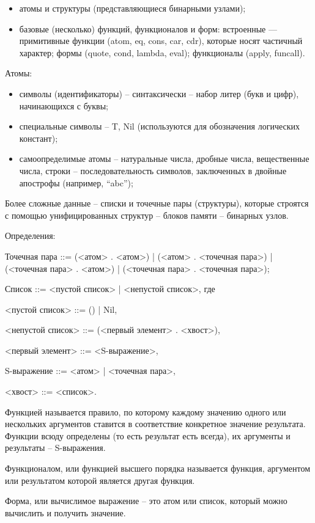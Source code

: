 \documentclass[12pt]{report}
\begin{document}
\begin{itemize}
	\item атомы и структуры (представляющиеся бинарными узлами);
	\item базовые (несколько) функций, функционалов и форм: встроенные — примитивные функции (atom, eq, cons, car, cdr), которые носят частичный  характер; формы (quote, cond, lambda, eval); функционалы (apply, funcall).
\end{itemize}

Атомы:
\begin{itemize} 
	\item символы (идентификаторы) – синтаксически – набор литер (букв и цифр), начинающихся с буквы;
	\item специальные символы – {T, Nil} (используются для обозначения логических констант);
	\item самоопределимые атомы – натуральные числа, дробные числа, вещественные числа, строки – последовательность символов, заключенных в двойные апострофы (например, “abc”);
\end{itemize} 

Более сложные данные – списки и точечные пары (структуры), которые строятся с помощью унифицированных структур – блоков памяти – бинарных узлов.

Определения:

Точечная пара ::= (<атом> . <атом>) | (<атом> . <точечная пара>) | (<точечная пара> . <атом>) | (<точечная пара> . <точечная пара>);

Список ::= <пустой список> | <непустой список>, где 

<пустой список> ::= () | Nil,

<непустой список> ::= (<первый элемент> . <хвост>),

<первый элемент> ::= <S-выражение>,

S-выражение ::= <атом> | <точечная пара>,

<хвост> ::= <список>.


Функцией называется правило, по которому каждому значению одного или нескольких  аргументов ставится в соответствие конкретное значение результата. Функции всюду определены (то есть результат есть всегда), их аргументы и результаты -- S-выражения.

Функционалом, или функцией высшего порядка называется функция, аргументом или  результатом которой является другая функция.

Форма, или вычислимое выражение – это атом или список, который можно  вычислить и получить значение.
\end{document}
